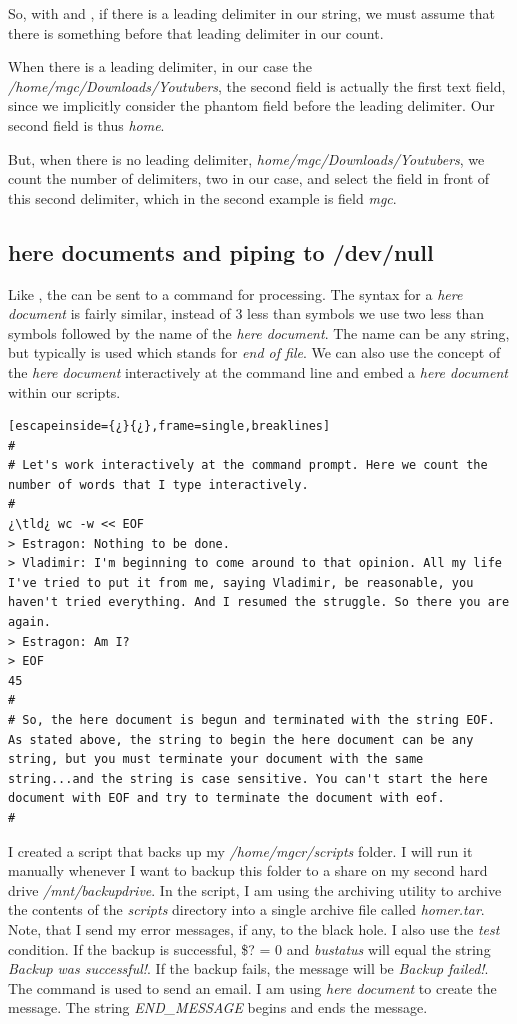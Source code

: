So, with  and , if there is a leading delimiter in our string, we must assume that there is something before that leading delimiter in our count.

When there is a leading delimiter, in our case the \textsl{/home/mgc/Downloads/Youtubers}, the second field is actually the first text field, since we implicitly consider the phantom field before the leading delimiter. Our second field is thus \textsl{home}. 

But, when there is no leading delimiter, \textsl{home/mgc/Downloads/Youtubers}, we count the number of delimiters, two in our case, and select the field in front of this second delimiter, which in the second example is field \textsl{mgc}.

\subsection{here documents and piping to /dev/null}

Like , the  can be sent to a command for processing. The syntax for a \emph{here document} is fairly similar, instead of 3 less than symbols we use two less than symbols followed by the name of the \emph{here document}. The name can be any string, but typically  is used which stands for \emph{end of file}. We can also use the concept of the \emph{here document} interactively at the command line and embed a \emph{here document} within our scripts.

\begin{lstlisting}[escapeinside={¿}{¿},frame=single,breaklines]
#
# Let's work interactively at the command prompt. Here we count the number of words that I type interactively.
#
¿\tld¿ wc -w << EOF
> Estragon: Nothing to be done.
> Vladimir: I'm beginning to come around to that opinion. All my life I've tried to put it from me, saying Vladimir, be reasonable, you haven't tried everything. And I resumed the struggle. So there you are again.
> Estragon: Am I?
> EOF
45
#
# So, the here document is begun and terminated with the string EOF. As stated above, the string to begin the here document can be any string, but you must terminate your document with the same string...and the string is case sensitive. You can't start the here document with EOF and try to terminate the document with eof.
#
\end{lstlisting}

I created a script that backs up my \textsl{/home/mgcr/scripts} folder. I will run it manually whenever I want to backup this folder to a share on my second hard drive \textsl{/mnt/backupdrive}. In the script, I am using the archiving utility  to archive the contents of the \textsl{scripts} directory into a single archive file called \textsl{homer.tar}. Note, that I send my error messages, if any, to the black hole. I also use the \emph{test} condition. If the backup is successful, \$? = 0 and \emph{bustatus} will equal the string \emph{Backup was successful!}. If the backup fails, the message will be \emph{Backup failed!}. The  command is used to send an email. I am using \emph{here document} to create the message. The string \emph{END\_MESSAGE} begins and ends the message.

